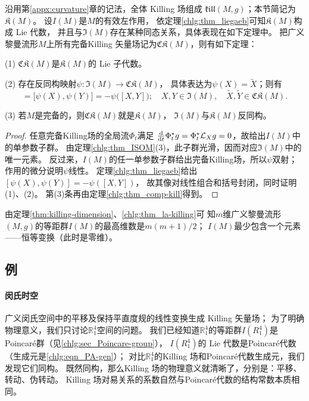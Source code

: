 沿用第\ref{appx:curvature}章的记法，全体 Killing 场组成 $\mathfrak{kill}(M,g)$；本节简记为 $\mathfrak K(M)$。
设$I(M)$是$M$的有效左作用，
依定理\ref{chlg:thm_liegaeb}可知$\mathfrak{K}(M)$构成 Lie 代数，
并且与$\mathfrak{I}(M)$存在某种同态关系，具体表现在如下定理中。
把广义黎曼流形$M$上所有{完备}Killing 矢量场记为$\mathfrak{CK}(M)$，则有如下定理：
\begin{theorem}\label{chlg:thm_la-killing}
    (1) $\mathfrak{CK}(M)$是$\mathfrak{K}(M)$的 Lie 子代数。

    (2) 存在反同构映射$\psi:\mathfrak{I}(M) \to \mathfrak{CK}(M)$，
    具体表达为$\psi(X)=\widetilde{X}$；则有
    \begin{equation*}
        [\widetilde{X},\widetilde{Y}]=\bigl[\psi(X),\psi(Y)\bigr]=-\psi\bigl([X,Y]\bigr);
        \quad X,Y\in\mathfrak{I}(M), \quad
        \widetilde{X},\widetilde{Y} \in \mathfrak{CK}(M).
    \end{equation*}

    (3) 若$M$是完备的，则$\mathfrak{CK}(M)$就是$\mathfrak{K}(M)$，
    $\mathfrak{I}(M)$与$\mathfrak{K}(M)$反同构。
\end{theorem}
\begin{proof}
    任意完备Killing场的全局流$\Phi_t$满足
    $\frac{\dd}{\dd t}\Phi_t^*g=\Phi_t^*\mathcal L_Xg=0$，故给出$I(M)$中的单参数子群。
    由定理\ref{chlg:thm_ISOM}(3)，此子群光滑，因而对应$\mathfrak I(M)$中的唯一元素。
    反过来，$I(M)$的任一单参数子群给出完备Killing场，所以$\psi$双射；
    作用的微分说明$\psi$线性。
    定理\ref{chlg:thm_liegaeb}给出$[\psi(X),\psi(Y)]=-\psi([X,Y])$，
    故其像对线性组合和括号封闭，同时证明(1)、(2)。
    第(3)条再由定理\ref{chlg:thm_comp-kill}得到。
\end{proof}

\begin{remark}
	由定理\ref{thm:killing-dimension}、\ref{chlg:thm_la-killing}可
	知$m$维广义黎曼流形$(M,g)$的等距群$I(M)$的最高维数是$m(m+1)/2$；
	$I(M)$最少包含一个元素——恒等变换（此时是零维）。
\end{remark}



\subsection{例}

\paragraph{闵氏时空}
广义闵氏空间中的平移及保持平直度规的线性变换生成 Killing 矢量场；
为了明确物理意义，我们只讨论$\mathbb{R}^4_1$空间的问题。
我们已经知道$\mathbb{R}^4_1$的等距群$I({R}^4_1)$是Poincar\'{e}群（见\ref{chlg:sec_Poincare-group}），
$I({R}^4_1)$的 Lie 代数是Poincar\'{e}代数（生成元是\eqref{chlg:eqn_PA-gen}）；
对比$\mathbb{R}^4_1$的Killing 场和Poincar\'{e}代数生成元，我们发现它们同构。
既然同构，那么Killing 场的物理意义就清晰了，分别是：平移、转动、伪转动。
Killing 场对易关系的系数自然与Poincar\'{e}代数的结构常数本质相同。

